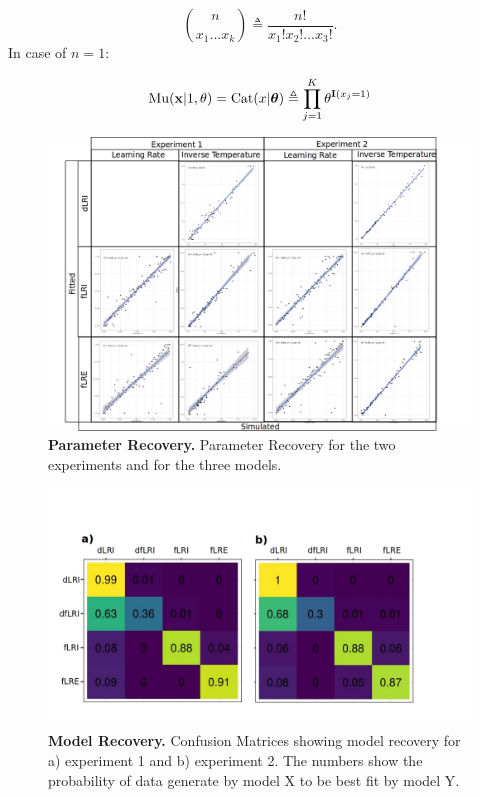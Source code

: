 \documentclass[a4paper,12pt]{article} 			%
\begin{document}
\begin{equation}
 \binom{n}{x_1...x_k}\triangleq\dfrac{n!}{x_1!x_2!...x_3!}.
\end{equation}
In case of $n=1$:

\begin{equation}
\mathrm{Mu}(\boldsymbol{\mathrm{x}}|1,\mathbf{\theta})= \mathrm{Cat}(x|\boldsymbol{\theta})\triangleq \prod^K_{j=1}\theta^{\bold{I}(x_j=1)}
\end{equation}

%
% 


\begin{figure}[ht!]
\centerline
{\includegraphics[width=1.5\textwidth]{figures/ParameterRecoveryAll.jpg}}
\caption{\textbf{Parameter Recovery.} Parameter Recovery for the two experiments and for the three models.}
\label{fig:parameter_recovery}
\end{figure}

\begin{figure}[ht!]
\centerline
{\includegraphics[width=1\textwidth]{figures/ModelRecovery.jpg}}
\caption{\textbf{Model Recovery.} Confusion Matrices showing model recovery for a) experiment 1 and b) experiment 2. The numbers show the probability of data generate by model X to be best fit by model Y.}
\label{fig:model_recovery}
\end{figure}
\end{document}
